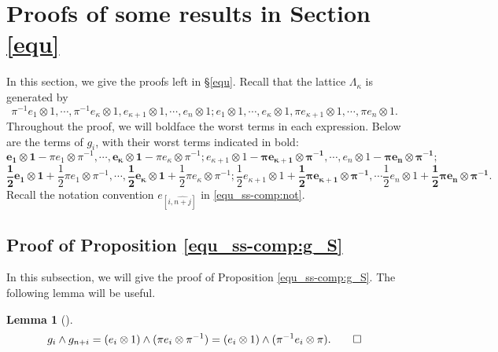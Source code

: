 \documentclass[pdflatex,sn-mathphys-num]{sn-jnl}%
\theoremstyle{thmstyleone}%
\newtheorem{lemma}[subsubsection]{Lemma}%
\theoremstyle{thmstyletwo}%
\numberwithin{equation}{subsection}
\theoremstyle{thmstylethree}%
\newcommand{\wh}{\widehat}
\begin{document}
\section{Proofs of some results in Section \ref{equ}}
In this section, we give the proofs left in \S \ref{equ}.
Recall that the lattice $\Lambda_{\kappa}$ is generated by
\begin{equation*}
	\pi^{-1}e_1\otimes 1,\cdots,\pi^{-1}e_{\kappa}\otimes 1,e_{\kappa+1}\otimes 1,\cdots,e_n\otimes 1; e_1\otimes 1,\cdots,e_{\kappa}\otimes 1,\pi e_{\kappa+1}\otimes 1,\cdots,\pi e_n\otimes 1.
\end{equation*}
Throughout the proof, we will boldface the worst terms in each expression. Below are the terms of $g_i$, with their worst terms indicated in bold:
\begin{equation*}
	\mathbf{e_1\otimes 1}-\pi e_1\otimes\pi^{-1},\cdots,\mathbf{e_\kappa\otimes 1}-\pi e_\kappa\otimes\pi^{-1};e_{\kappa+1}\otimes 1-\mathbf{\pi e_{\kappa+1}\otimes\pi^{-1}},
	\cdots,
	e_{n}\otimes 1-\mathbf{\pi e_{n}\otimes\pi^{-1}};	
\end{equation*}
\begin{equation*}
	\mathbf{\frac{1}{2}e_1\otimes 1}+\frac{1}{2}\pi e_1\otimes \pi^{-1},
	\cdots,
	\mathbf{\frac{1}{2}e_\kappa\otimes 1}+\frac{1}{2}\pi e_\kappa\otimes \pi^{-1};	
	\frac{1}{2}e_{\kappa+1}\otimes 1+\mathbf{\frac{1}{2}\pi e_{\kappa+1}\otimes \pi^{-1}},
	\cdots
	\frac{1}{2}e_{n}\otimes 1+\mathbf{\frac{1}{2}\pi e_{n}\otimes \pi^{-1}}.	
\end{equation*}
Recall the notation convention $e_{[i,\wh{n+j}]}$ in \eqref{equ_ss-comp:not}.
\subsection{Proof of Proposition \ref{equ_ss-comp:g_S}}\label{Appendix_first-proof}
In this subsection, we will give the proof of Proposition \ref{equ_ss-comp:g_S}. The following lemma will be useful.
\begin{lemma}[]\label{equ_ss-comp:two-wedges}
\[
	g_i\wedge g_{n+i} =  (e_i\otimes 1)\wedge(\pi e_i\otimes \pi^{-1})=  (e_i\otimes 1)\wedge (\pi^{-1}e_i\otimes \pi).	\qed
\]
\end{lemma}
\end{document}
